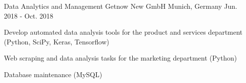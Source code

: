 \begin{cventries}

\cventry
{Data Analytics and Management} %
{Getnow New GmbH} %
{Munich, Germany} %
{Jun. 2018 - Oct. 2018} %
{ %
\begin{cvitems}
\item {Develop automated data analysis tools for the product and services department (Python, SciPy, Keras, Tensorflow)}
\item {Web scraping and data analysis tasks for the marketing department (Python)}
\item {Database maintenance (MySQL)}
\end{cvitems}
}

\end{cventries}